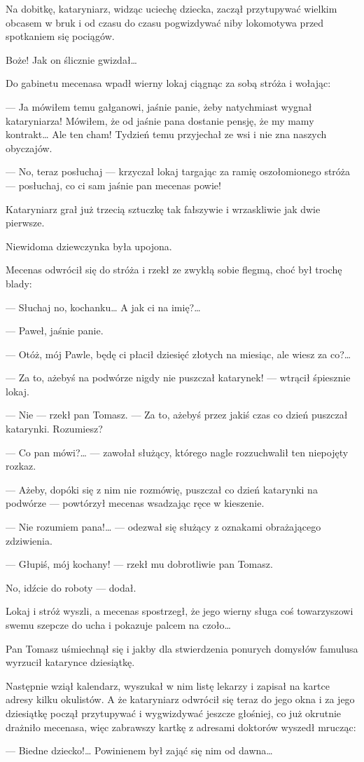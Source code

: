 Na dobitkę, kataryniarz, widząc uciechę dziecka, zaczął przytupywać
wielkim obcasem w bruk i od czasu do czasu pogwizdywać niby lokomotywa
przed spotkaniem się pociągów.

Boże! Jak on ślicznie gwizdał…

Do gabinetu mecenasa wpadł wierny lokaj ciągnąc za sobą stróża i
wołając:

— Ja mówiłem temu gałganowi, jaśnie panie, żeby natychmiast wygnał
kataryniarza! Mówiłem, że od jaśnie pana dostanie pensję, że my mamy
kontrakt… Ale ten cham! Tydzień temu przyjechał ze wsi i nie zna
naszych obyczajów.

— No, teraz posłuchaj — krzyczał lokaj targając za ramię oszołomionego
stróża — posłuchaj, co ci sam jaśnie pan mecenas powie!

Kataryniarz grał już trzecią sztuczkę tak fałszywie i wrzaskliwie jak
dwie pierwsze.

Niewidoma dziewczynka była upojona.

Mecenas odwrócił się do stróża i rzekł ze zwykłą sobie flegmą, choć
był trochę blady:

— Słuchaj no, kochanku… A jak ci na imię?…

— Paweł, jaśnie panie.

— Otóż, mój Pawle, będę ci płacił dziesięć złotych na miesiąc, ale
wiesz za co?…

— Za to, ażebyś na podwórze nigdy nie puszczał katarynek! — wtrącił
śpiesznie lokaj.

— Nie — rzekł pan Tomasz. — Za to, ażebyś przez jakiś czas co dzień
puszczał katarynki. Rozumiesz?

— Co pan mówi?… — zawołał służący, którego nagle rozzuchwalił ten
niepojęty rozkaz.

— Ażeby, dopóki się z nim nie rozmówię, puszczał co dzień katarynki na
podwórze — powtórzył mecenas wsadzając ręce w kieszenie.

— Nie rozumiem pana!… — odezwał się służący z oznakami obrażającego
zdziwienia.

— Głupiś, mój kochany! — rzekł mu dobrotliwie pan Tomasz.

No, idźcie do roboty — dodał.

Lokaj i stróż wyszli, a mecenas spostrzegł, że jego wierny sługa coś
towarzyszowi swemu szepcze do ucha i pokazuje palcem na czoło…

Pan Tomasz uśmiechnął się i jakby dla stwierdzenia ponurych domysłów
famulusa wyrzucił katarynce dziesiątkę.

Następnie wziął kalendarz, wyszukał w nim listę lekarzy i zapisał na
kartce adresy kilku okulistów. A że kataryniarz odwrócił się teraz do
jego okna i za jego dziesiątkę począł przytupywać i wygwizdywać
jeszcze głośniej, co już okrutnie drażniło mecenasa, więc zabrawszy
kartkę z adresami doktorów wyszedł mrucząc:

— Biedne dziecko!… Powinienem był zająć się nim od dawna…
